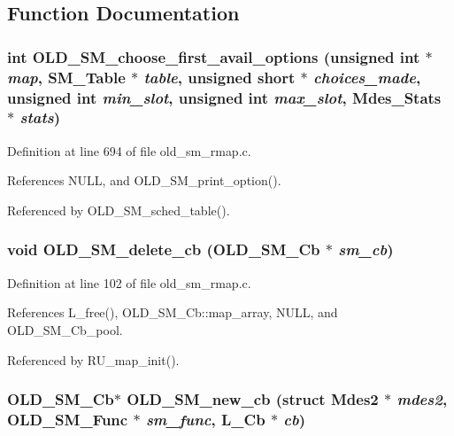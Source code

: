 \subsection{Function Documentation}
\subsubsection{\setlength{\rightskip}{0pt plus 5cm}int OLD\_\-SM\_\-choose\_\-first\_\-avail\_\-options (unsigned int $\ast$ {\em map}, SM\_\-Table $\ast$ {\em table}, unsigned short $\ast$ {\em choices\_\-made}, unsigned int {\em min\_\-slot}, unsigned int {\em max\_\-slot}, Mdes\_\-Stats $\ast$ {\em stats})}\label{old__sm_8h_582037c63a20285d19dfe12ed2dea91d}




Definition at line 694 of file old\_\-sm\_\-rmap.c.

References NULL, and OLD\_\-SM\_\-print\_\-option().

Referenced by OLD\_\-SM\_\-sched\_\-table().
\subsubsection{\setlength{\rightskip}{0pt plus 5cm}void OLD\_\-SM\_\-delete\_\-cb (\bf{OLD\_\-SM\_\-Cb} $\ast$ {\em sm\_\-cb})}\label{old__sm_8h_bba3da2bbe4aa10245598f765e55f45f}




Definition at line 102 of file old\_\-sm\_\-rmap.c.

References L\_\-free(), OLD\_\-SM\_\-Cb::map\_\-array, NULL, and OLD\_\-SM\_\-Cb\_\-pool.

Referenced by RU\_\-map\_\-init().
\subsubsection{\setlength{\rightskip}{0pt plus 5cm}\bf{OLD\_\-SM\_\-Cb}$\ast$ OLD\_\-SM\_\-new\_\-cb (struct Mdes2 $\ast$ {\em mdes2}, \bf{OLD\_\-SM\_\-Func} $\ast$ {\em sm\_\-func}, L\_\-Cb $\ast$ {\em cb})}\label{old__sm_8h_d934a193f9acaf1e10a63a04cf3708f1}




